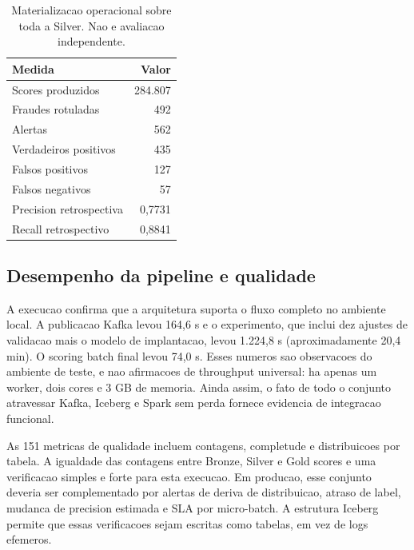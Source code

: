 \documentclass[10pt,twocolumn]{article}
\begin{document}
\begin{table}[ht]
\centering
\caption{Materializacao operacional sobre toda a Silver. Nao e avaliacao independente.}
\label{tab:operational}
\begin{tabular}{lr}
\toprule
Medida & Valor \\
\midrule
Scores produzidos & 284.807 \\
Fraudes rotuladas & 492 \\
Alertas & 562 \\
Verdadeiros positivos & 435 \\
Falsos positivos & 127 \\
Falsos negativos & 57 \\
Precision retrospectiva & 0,7731 \\
Recall retrospectivo & 0,8841 \\
\bottomrule
\end{tabular}
\end{table}

\begin{center}
\end{center}

\subsection{Desempenho da pipeline e qualidade}

A execucao confirma que a arquitetura suporta o fluxo completo no ambiente local. A publicacao Kafka levou 164,6 s e o experimento, que inclui dez ajustes de validacao mais o modelo de implantacao, levou 1.224,8 s (aproximadamente 20,4 min). O scoring batch final levou 74,0 s. Esses numeros sao observacoes do ambiente de teste, e nao afirmacoes de throughput universal: ha apenas um worker, dois cores e 3 GB de memoria. Ainda assim, o fato de todo o conjunto atravessar Kafka, Iceberg e Spark sem perda fornece evidencia de integracao funcional.

As 151 metricas de qualidade incluem contagens, completude e distribuicoes por tabela. A igualdade das contagens entre Bronze, Silver e Gold scores e uma verificacao simples e forte para esta execucao. Em producao, esse conjunto deveria ser complementado por alertas de deriva de distribuicao, atraso de label, mudanca de precision estimada e SLA por micro-batch. A estrutura Iceberg permite que essas verificacoes sejam escritas como tabelas, em vez de logs efemeros.
\end{document}
